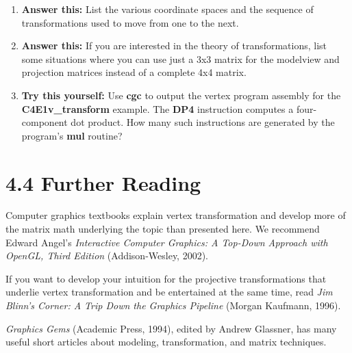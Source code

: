 \documentclass{book}
\begin{document}
\begin{enumerate}
\item \textbf{Answer this:} List the various coordinate spaces and the sequence of transformations used to move from one to the next.
\item \textbf{Answer this:} If you are interested in the theory of transformations, list some situations where you can use just a 3x3 matrix for the modelview and projection matrices instead of a complete 4x4 matrix.
\item \textbf{Try this yourself:} Use \textbf{cgc} to output the vertex program assembly for the \textbf{C4E1v_transform} example. The \textbf{DP4} instruction computes a four-component dot product. How many such instructions are generated by the program's \textbf{mul} routine?
\end{enumerate}

\section{4.4 Further Reading}

Computer graphics textbooks explain vertex transformation and develop more of the matrix math underlying the topic than presented here. We recommend Edward Angel's \textit{Interactive Computer Graphics: A Top-Down Approach with OpenGL, Third Edition} (Addison-Wesley, 2002).

If you want to develop your intuition for the projective transformations that underlie vertex transformation and be entertained at the same time, read \textit{Jim Blinn's Corner: A Trip Down the Graphics Pipeline} (Morgan Kaufmann, 1996).

\textit{Graphics Gems} (Academic Press, 1994), edited by Andrew Glassner, has many useful short articles about modeling, transformation, and matrix techniques.
\end{document}
